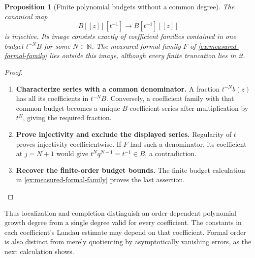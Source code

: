 \documentclass[11pt,a4paper]{article}
\numberwithin{algorithm}{section}
\numberwithin{equation}{section}
\newtheorem{proposition}[proposition]{Proposition}
\theoremstyle{definition}
\theoremstyle{remark}
\theoremstyle{plain}
\newcommand{\N}{\mathbb N}
\theoremstyle{definition}
\theoremstyle{plain}
\begin{document}
\begin{proposition}[Finite polynomial budgets without a common degree]
\label{prop:measured-completion-overhead}
The canonical map
\begin{equation}\label{eq:infinite-denominators}
 B[[z]][t^{-1}]\longrightarrow B[t^{-1}][[z]]
\end{equation}
is injective. Its image consists exactly of coefficient families
contained in one budget $t^{-N}B$ for some $N\in\N$.
The measured formal family $F$ of \cref{ex:measured-formal-family}
lies outside this image, although every finite truncation lies in it.
\end{proposition}
\begin{proof}\leavevmode
\begin{enumerate}[leftmargin=*,align=left]
\item \textbf{Characterize series with a common denominator.}
A fraction $t^{-N}b(z)$ has all its coefficients in $t^{-N}B$.
Conversely, a coefficient family with that common budget becomes a
unique $B$-coefficient series after multiplication by $t^N$, giving
the required fraction.

\item \textbf{Prove injectivity and exclude the displayed series.}
Regularity of $t$ proves injectivity
coefficientwise. If $F$ had such a denominator, its coefficient at
$j=N+1$ would give $t^Nq^{N+1}=t^{-1}\in B$, a contradiction.

\item \textbf{Recover the finite-order budget bounds.}
The finite budget calculation in \cref{ex:measured-formal-family}
proves the last assertion.
\end{enumerate}
\end{proof}

Thus localization and completion distinguish an order-dependent
polynomial growth degree from a single degree valid for every
coefficient. The constants in each coefficient's Landau estimate may
depend on that coefficient. Formal order is also distinct from merely
quotienting by asymptotically vanishing errors, as the next calculation
shows.
\end{document}
